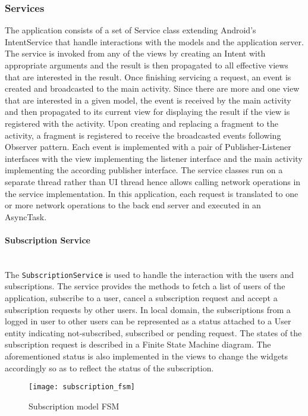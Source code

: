 \subsubsection{Services}
The application consists of a set of Service class extending Android's IntentService that handle interactions with the models
and the application server. The service is invoked from any of the views by creating an Intent with appropriate
arguments and the result is then propagated to all effective views that are interested in the result. Once finishing
servicing a request, an event is created and broadcasted to the main activity. Since there are more and one view that
are interested in a given model, the event is received by the main activity and then propagated to its current view for
displaying the result if the view is registered with the activity. Upon creating and replacing a fragment to the
activity, a fragment is registered to receive the broadcasted events following Observer pattern. Each event is
implemented with a pair of Publisher-Listener interfaces with the view implementing the listener interface and the main
activity implementing the according publisher interface.
The service classes run on a separate thread rather than UI thread hence allows calling network operations in the
service implementation. In this application, each request is translated to one or more network operations to the back
end server and executed in an AsyncTask.

\paragraph{Subscription Service} \mbox{} \\
The \texttt{SubscriptionService} is used to handle the interaction with the users and subscriptions. The service provides the
methods to fetch a list of users of the application, subscribe to a user, cancel a subscription request and accept a
subscription requests by other users.  In local domain, the subscriptions from a logged in user to other users can be
represented as a status attached to a User entity indicating not-subscribed, subscribed or pending request. The states
of the subscription request is described in a Finite State Machine diagram. The aforementioned status is also
implemented in the views to change the widgets accordingly so as to reflect the status of the subscription.

\begin{figure}[!ht]
    \caption{Subscription model FSM}
    \centering
    \texttt{[image: subscription\_fsm]}
\end{figure}

